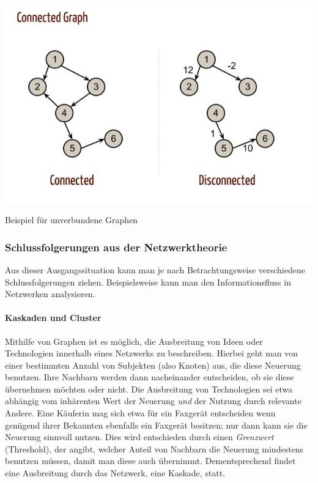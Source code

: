 \begin{dsafigure}
	\begin{center}
	\includegraphics[width=0.9\columnwidth]{img/Graph-Connected.jpg}
	\caption{Beispiel für unverbundene Graphen \parencite[vgl.]{Kleinberg-2009-oz}}
	\label{fig:graph-connected}
	\end{center}
\end{dsafigure}


\subsubsection{Schlussfolgerungen aus der Netzwerktheorie}

Aus dieser Ausgangssituation kann man je nach Betrachtungsweise verschiedene Schlussfolgerungen ziehen.
Beispielsweise kann man den Informationsfluss in Netzwerken analysieren.


\paragraph{Kaskaden und Cluster}

Mithilfe von Graphen ist es möglich, die Ausbreitung von Ideen oder Technologien innerhalb eines Netzwerks zu beschreiben.
Hierbei geht man von einer bestimmten Anzahl von Subjekten (also Knoten) aus, die diese Neuerung benutzen.
Ihre Nachbarn werden dann nacheinander entscheiden, ob sie diese übernehmen möchten oder nicht.
Die Ausbreitung von Technologien sei etwa abhängig vom inhärenten Wert der Neuerung \emph{und} der Nutzung durch relevante Andere.
Eine Käuferin mag sich etwa für ein Faxgerät entscheiden wenn genügend ihrer Bekannten ebenfalls ein Faxgerät besitzen; nur dann kann sie die Neuerung sinnvoll nutzen.
Dies wird entschieden durch einen \emph{Grenzwert} (Threshold), der angibt, welcher Anteil von Nachbarn die Neuerung mindestens benutzen müssen, damit man diese auch übernimmt.
Dementsprechend findet eine Ausbreitung durch das Netzwerk, eine Kaskade, statt.

